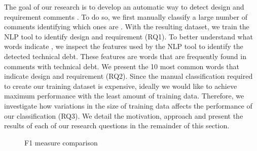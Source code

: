 The goal of our research is to develop an automatic way to detect design and requirement \SATD comments . To do so, we first manually classify a large number of comments identifying which ones are \SATD. With the resulting dataset, we train the NLP tool to identify design and requirement \SATD (RQ1). To better understand what words indicate \SATD, we inspect the features used by the NLP tool to identify the detected technical debt. These features are words that are frequently found in comments with technical debt. We present the 10 most common words that indicate design and requirement \SATD (RQ2). Since the manual classification required to create our training dataset is expensive, ideally we would like to achieve maximum performance with the least amount of training data. Therefore, we investigate how variations in the size of training data affects the performance of our classification (RQ3). We detail the motivation, approach and present the results of each of our research questions in the remainder of this section.    

\begin{figure}[!thb]
  \centering
  \caption{F1 measure comparison}
\end{figure}


